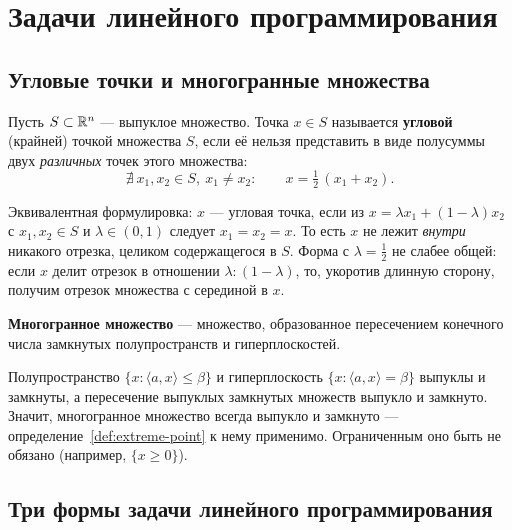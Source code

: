 
\section{Задачи линейного программирования}

\subsection{Угловые точки и многогранные множества}

\begin{definition}\label{def:extreme-point}
Пусть $S \subset \mathbb{R}^n$ — выпуклое множество. Точка $x \in S$ называется
\textbf{угловой} (крайней) точкой множества $S$, если её нельзя представить
в виде полусуммы двух \emph{различных} точек этого множества:
\[
  \nexists\ x_1, x_2 \in S,\ x_1 \ne x_2 : \qquad x = \tfrac{1}{2}\,(x_1 + x_2).
\]
\end{definition}

\begin{idea}
Эквивалентная формулировка: $x$ — угловая точка, если из
$x = \lambda x_1 + (1-\lambda) x_2$ с $x_1, x_2 \in S$ и $\lambda \in (0,1)$
следует $x_1 = x_2 = x$. То есть $x$ не лежит \emph{внутри} никакого отрезка,
целиком содержащегося в $S$. Форма с $\lambda = \tfrac12$ не слабее общей:
если $x$ делит отрезок в отношении $\lambda : (1-\lambda)$, то, укоротив длинную
сторону, получим отрезок множества с серединой в $x$.
\end{idea}


\begin{definition}\label{def:polyhedral}
\textbf{Многогранное множество} — множество, образованное пересечением конечного
числа замкнутых полупространств и гиперплоскостей.
\end{definition}

\begin{idea}
Полупространство $\{x : \langle a, x\rangle \le \beta\}$ и гиперплоскость
$\{x : \langle a, x\rangle = \beta\}$ выпуклы и замкнуты, а пересечение выпуклых
замкнутых множеств выпукло и замкнуто. Значит, многогранное множество всегда
выпукло и замкнуто — определение~\ref{def:extreme-point} к нему применимо.
Ограниченным оно быть не обязано (например, $\{x \ge 0\}$).
\end{idea}

\subsection{Три формы задачи линейного программирования}

